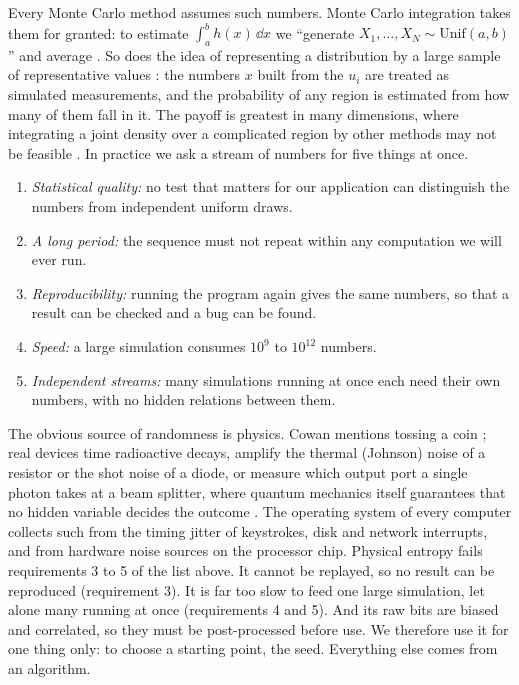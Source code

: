 Every Monte Carlo method assumes such numbers. Monte Carlo integration takes them
for granted: to
estimate $\int_a^b h(x)\,\dd x$ we ``generate $X_1,\dots,X_N\sim\mathrm{Unif}(a,b)$''
and average . So does the idea of representing a
distribution by a large sample of representative values :
the numbers $x$ built from the $u_i$ are treated as simulated measurements, and
the probability of any region is estimated from how many of them fall in it. The
payoff is greatest in many dimensions, where integrating a joint density over a
complicated region by other methods may not be feasible .
In practice we ask a stream of numbers for five things at once.
\begin{enumerate}[itemsep=1pt]
  \item \emph{Statistical quality:} no test that matters for our application can
        distinguish the numbers from independent uniform draws.
  \item \emph{A long period:} the sequence must not repeat within any
        computation we will ever run.
  \item \emph{Reproducibility:} running the program again gives the same numbers,
        so that a result can be checked and a bug can be found.
  \item \emph{Speed:} a large simulation consumes $10^{9}$ to $10^{12}$ numbers.
  \item \emph{Independent streams:} many simulations running at once each need
        their own numbers, with no hidden relations between them.
\end{enumerate}

The obvious source of randomness is physics. Cowan mentions tossing a coin
; real devices time radioactive decays, amplify the thermal
(Johnson) noise of a resistor or the shot noise of a diode, or measure which
output port a single photon takes at a beam splitter, where quantum mechanics
itself guarantees that no hidden variable decides the outcome
. The operating system of every computer collects
such   from the timing jitter of keystrokes, disk
and network interrupts, and from hardware noise sources on the processor chip.
Physical entropy fails requirements 3 to 5 of the list above. It cannot be
replayed, so no result can be reproduced (requirement 3). It is far too slow to
feed one large simulation, let alone many running at once (requirements 4 and
5). And its raw bits are biased and correlated, so they must be post-processed
before use. We therefore use it for one thing only: to choose a starting
point, the seed. Everything else comes from an algorithm.

